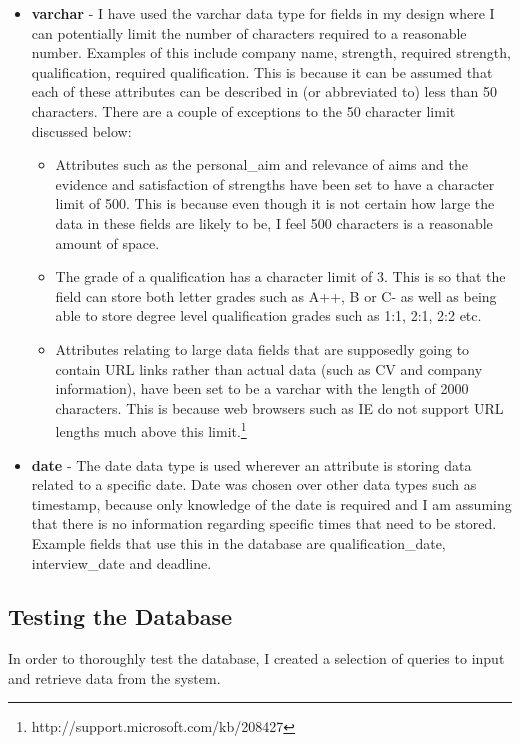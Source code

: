 \documentclass{article}
\begin{document}
\begin{itemize}
\item \textbf{varchar} - I have used the varchar data type for fields in my design where I can potentially limit the number of characters required to a reasonable number. Examples of this include company name, strength, required strength, qualification, required qualification. This is because it can be assumed that each of these attributes can be described in (or abbreviated to) less than 50 characters. There are a couple of exceptions to the 50 character limit discussed below:

\begin{itemize}
\item Attributes such as the personal\_aim and relevance of aims and the evidence and satisfaction of strengths have been set to have a character limit of 500. This is because even though it is not certain how large the data in these fields are likely to be, I feel 500 characters is a reasonable amount of space.

\item The grade of a qualification has a character limit of 3. This is so that the field can store both letter grades such as A++, B or C- as well as being able to store degree level qualification grades such as 1:1, 2:1, 2:2 etc. 

\item Attributes relating to large data fields that are supposedly going to contain URL links rather than actual data (such as CV and company information), have been set to be a varchar with the length of 2000 characters. This is because web browsers such as IE do not support URL lengths much above this limit.\footnote{http://support.microsoft.com/kb/208427}

\end{itemize}

\item \textbf{date} - The date data type is used wherever an attribute is storing data related to a specific date. Date was chosen over other data types such as timestamp, because only knowledge of the date is required and I am assuming that there is no information regarding specific times that need to be stored. Example fields that use this in the database are qualification\_date, interview\_date and deadline.

\end{itemize}

\subsection{Testing the Database}
In order to thoroughly test the database, I created a selection of queries to input and retrieve data from the system. 
\end{document}

